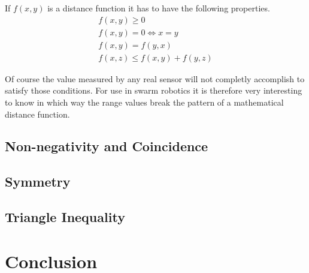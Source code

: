 If $f(x, y)$ is a distance function it has to have the following properties.
\begin{eqnarray}
f(x, y) \ge 0 \\
f(x, y) = 0 \iff x = y \\ 
f(x, y) = f(y, x) \\ 
f(x, z) \le f(x, y) + f(y, z)
\end{eqnarray}

Of course the value measured by any real sensor will not completly accomplish to satisfy those conditions.
For use in swarm robotics it is therefore very interesting to know in which way the range values break the pattern of a mathematical distance function.

\subsection{Non-negativity and Coincidence}

\subsection{Symmetry}

\subsection{Triangle Inequality}



\section{Conclusion}
